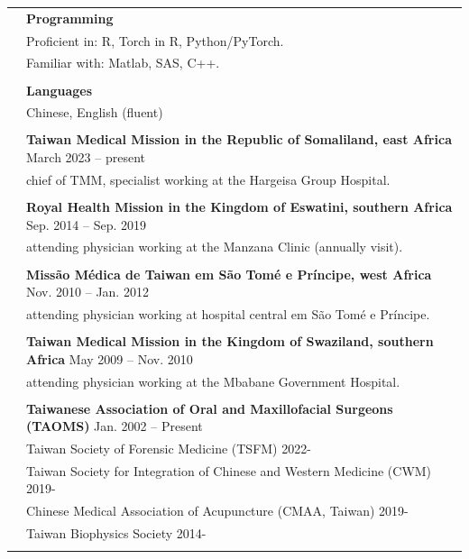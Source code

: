\documentclass[letterpaper, 11pt]{article}
\begin{document}
\begin{longtable}{p{1.3in}p{4.8in}}
{\color{OliveGreen}{Skills}} 
& \textbf{Programming}\\
& Proficient in: R, Torch in R, Python/PyTorch. \\
& Familiar with: Matlab, SAS, C++. \\
& \\

& \textbf{Languages} \\
& Chinese, English (fluent) \\
& \\


\color{OliveGreen}{Service and outreach by TMU} %
& \textbf{Taiwan Medical Mission in the Republic of Somaliland, east Africa} \hfill March 2023 -- present \\
& chief of TMM, specialist working at the Hargeisa Group Hospital. \\
& \\

& \textbf{Royal Health Mission in the Kingdom of Eswatini, southern Africa} \hfill Sep. 2014 -- Sep. 2019 \\
& attending physician working at the Manzana Clinic (annually visit). \\
& \\

& \textbf{Missão Médica de Taiwan em São Tomé e Príncipe, west Africa} \hfill Nov. 2010 -- Jan. 2012 \\
& attending physician working at hospital central em São Tomé e Príncipe. \\
& \\

& \textbf{Taiwan Medical Mission in the Kingdom of Swaziland, southern Africa} \hfill May 2009 -- Nov. 2010 \\
& attending physician working at the Mbabane Government Hospital. \\
& \\


\nohyphens{\color{OliveGreen}{Professional memberships}}
& {\textbf{Taiwanese Association of Oral and Maxillofacial Surgeons (TAOMS)}} \hfill Jan. 2002 -- Present \\
& Taiwan Society of Forensic Medicine (TSFM) \hfill 2022-\\ 
& Taiwan Society for Integration of Chinese and Western Medicine (CWM) \hfill 2019-\\
& Chinese Medical Association of Acupuncture (CMAA, Taiwan) \hfill 2019- \\
& Taiwan Biophysics Society \hfill 2014-\\ 
& \\


\end{longtable}
\end{document}
